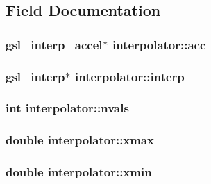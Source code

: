 \subsection{Field Documentation}
\hypertarget{structinterpolator_ac56df03bb67d65c1ebfd99a4c0d5438b}{
\subsubsection[{acc}]{\setlength{\rightskip}{0pt plus 5cm}gsl\_\-interp\_\-accel$\ast$ {\bf interpolator::acc}}}
\label{structinterpolator_ac56df03bb67d65c1ebfd99a4c0d5438b}
\hypertarget{structinterpolator_abc3ee4eff3db3bcae7407d825710fb0d}{
\subsubsection[{interp}]{\setlength{\rightskip}{0pt plus 5cm}gsl\_\-interp$\ast$ {\bf interpolator::interp}}}
\label{structinterpolator_abc3ee4eff3db3bcae7407d825710fb0d}
\hypertarget{structinterpolator_a058a378f76dfb0349cd2016f450a7332}{
\subsubsection[{nvals}]{\setlength{\rightskip}{0pt plus 5cm}int {\bf interpolator::nvals}}}
\label{structinterpolator_a058a378f76dfb0349cd2016f450a7332}
\hypertarget{structinterpolator_a4ccf4f1e42f5207f311bffcbebb7ea9c}{
\subsubsection[{xmax}]{\setlength{\rightskip}{0pt plus 5cm}double {\bf interpolator::xmax}}}
\label{structinterpolator_a4ccf4f1e42f5207f311bffcbebb7ea9c}
\hypertarget{structinterpolator_a09c1238a6c4be948ef51e29676074b6f}{
\subsubsection[{xmin}]{\setlength{\rightskip}{0pt plus 5cm}double {\bf interpolator::xmin}}}
\label{structinterpolator_a09c1238a6c4be948ef51e29676074b6f}
